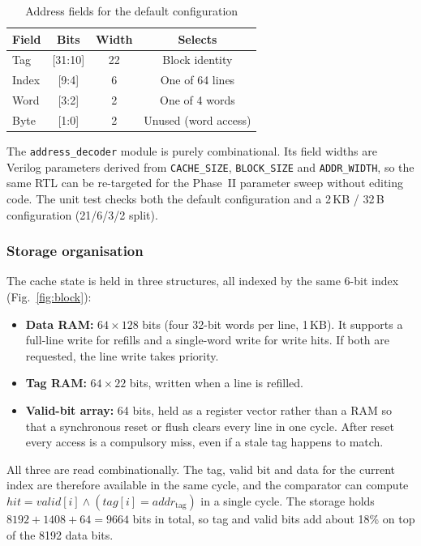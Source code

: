 \begin{table}[t]
\centering
\caption{Address fields for the default configuration}
\label{tab:addr}
\begin{tabular}{lccc}
\hline
Field & Bits & Width & Selects \\
\hline
Tag      & [31:10] & 22 & Block identity \\
Index    & [9:4]   & 6  & One of 64 lines \\
Word     & [3:2]   & 2  & One of 4 words \\
Byte     & [1:0]   & 2  & Unused (word access) \\
\hline
\end{tabular}
\end{table}

The \texttt{address\_decoder} module is purely combinational. Its field
widths are Verilog parameters derived from \texttt{CACHE\_SIZE},
\texttt{BLOCK\_SIZE} and \texttt{ADDR\_WIDTH}, so the same RTL can be
re-targeted for the Phase~II parameter sweep without editing code. The unit
test checks both the default configuration and a 2\,KB / 32\,B configuration
(21/6/3/2 split).

\subsubsection{Storage organisation}
The cache state is held in three structures, all indexed by the same 6-bit
index (Fig.~\ref{fig:block}):
\begin{itemize}
  \item \textbf{Data RAM:} $64 \times 128$ bits (four 32-bit words per line,
        1\,KB). It supports a full-line write for refills and a single-word
        write for write hits. If both are requested, the line write takes
        priority.
  \item \textbf{Tag RAM:} $64 \times 22$ bits, written when a line is refilled.
  \item \textbf{Valid-bit array:} 64 bits, held as a register vector rather
        than a RAM so that a synchronous reset or flush clears every line in
        one cycle. After reset every access is a compulsory miss, even if a
        stale tag happens to match.
\end{itemize}
All three are read combinationally. The tag, valid bit and data for the
current index are therefore available in the same cycle, and the comparator
can compute $\mathit{hit} = \mathit{valid}[i] \wedge (\mathit{tag}[i] =
\mathit{addr}_{\mathrm{tag}})$ in a single cycle. The storage holds
$8192 + 1408 + 64 = 9664$ bits in total, so tag and valid bits add about 18\%
on top of the 8192 data bits.

